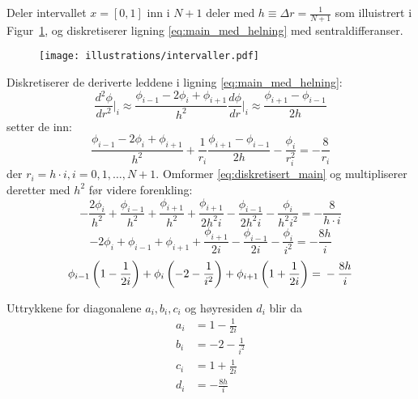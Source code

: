 \noindent Deler intervallet $x=[0,1]$ inn i $N+1$ deler med $h \equiv \Delta r = \frac{1}{N+1}$ som illuistrert i Figur~\ref{fig:diskretisering}, og diskretiserer ligning \eqref{eq:main_med_helning} med sentraldifferanser.

\begin{figure}[htbp]
  \centering
  \texttt{[image: illustrations/intervaller.pdf]}
  \caption{}
  \label{fig:diskretisering}
\end{figure}

\noindent Diskretiserer de deriverte leddene i ligning \eqref{eq:main_med_helning}:
\begin{subequations}
\begin{equation}
  \frac{d^2 \phi}{dr^2}\bigg|_i \approx \frac{\phi_{i-1} - 2\phi_i + \phi_{i+1}}{h^2}
\end{equation}
\begin{equation}
  \frac{d \phi}{dr} \bigg|_i \approx \frac{\phi_{i+1} - \phi_{i-1}}{2h}
\end{equation}
\end{subequations}
setter de inn:
\begin{equation}
  \frac{\phi_{i-1} - 2\phi_i + \phi_{i+1}}{h^2} + \frac{1}{r_i} \frac{\phi_{i+1} - \phi_{i-1}}{2h} - \frac{\phi_i}{r_i^2} = -\frac{8}{r_i} \label{eq:diskretisert_main}
\end{equation}
der $r_i = h\cdot i, i=0,1,\dots,N+1$. Omformer \eqref{eq:diskretisert_main} og multipliserer deretter med $h^2$ før videre forenkling:
\begin{equation}
  -\frac{2\phi_i}{h^2} + \frac{\phi_{i-1}}{h^2} + \frac{\phi_{i+1}}{h^2} + \frac{\phi_{i+1}}{2h^2 i} -  \frac{\phi_{i-1}}{2h^2 i} - \frac{\phi_i}{h^2 i^2} = -\frac{8}{h\cdot i} \nonumber
\end{equation}
\begin{equation}
  -2\phi_i + \phi_{i-1} + \phi_{i+1} + \frac{\phi_{i+1}}{2i} -  \frac{\phi_{i-1}}{2 i} - \frac{\phi_i}{i^2} = -\frac{8h}{i} \nonumber
\end{equation}
\begin{equation}
  \phi_{i-1} \left( 1- \frac{1}{2i} \right) + \\
  \phi_{i}   \left( -2 - \frac{1}{i^2}  \right) + \\
  \phi_{i+1} \left( 1 + \frac{1}{2i} \right) = \\
  -\frac{8h}{i}
\end{equation}

\noindent
Uttrykkene for diagonalene $a_i, b_i, c_i$ og høyresiden $d_i$ blir da
\begin{subequations}
\begin{align}
  a_i &= 1- \frac{1}{2i}   \\
  b_i &= -2 - \frac{1}{i^2} \\
  c_i &= 1 + \frac{1}{2i}   \\
  d_i &= -\frac{8h}{i}
\end{align}
\end{subequations}




